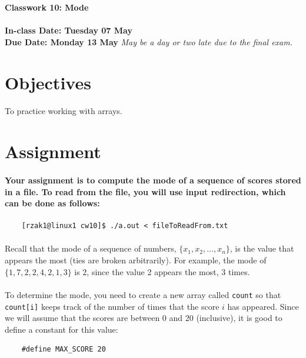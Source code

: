 \documentclass[letter,11pt]{article}
\begin{document}
\huge
\textbf{Classwork 10: Mode}
\normalsize
\\ ~~ \\
\textbf{In-class Date: Tuesday 07 May} \\
\textbf{Due Date: Monday 13 May} \textit{May be a day or two late due to the final exam.}

\section*{Objectives}
\paragraph{}To practice working with arrays.

\section*{Assignment}
\paragraph{Your assignment is to compute the mode of a sequence of scores stored in a file. To read from the file, you will use input redirection, which can be done as follows:}
\begin{verbatim}
    [rzak1@linux1 cw10]$ ./a.out < fileToReadFrom.txt
\end{verbatim}

\paragraph{}Recall that the mode of a sequence of numbers, $\{x_1, x_2, \ldots, x_n\}$, is the value that appears the most (ties are broken arbitrarily). For example, the mode of $\{1, 7, 2, 2, 4, 2, 1, 3\}$ is 2, since the value 2 appears the most, 3 times.

\paragraph{}To determine the mode, you need to create a new array called \texttt{count} so that \texttt{count[i]} keeps track of the number of times that the score $i$ has appeared. Since we will assume that the scores are between 0 and 20 (inclusive), it is good to define a constant for this value:
\begin{verbatim}
    #define MAX_SCORE 20
\end{verbatim}
\end{document}
